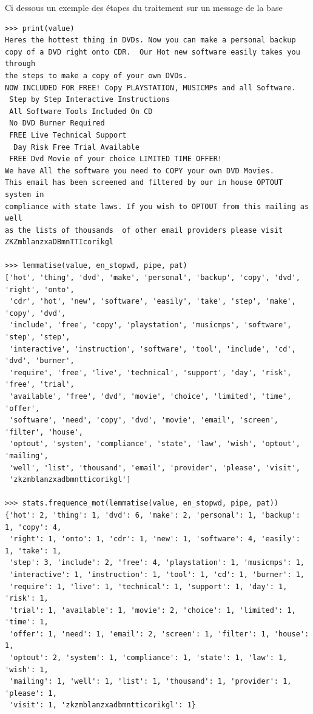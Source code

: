 \documentclass[a4paper,12pt]{article}
\begin{document}
			Ci dessous un exemple des étapes du traitement sur un message de la base
			\begin{verbatim}
>>> print(value)
Heres the hottest thing in DVDs. Now you can make a personal backup
copy of a DVD right onto CDR.  Our Hot new software easily takes you through
the steps to make a copy of your own DVDs.
NOW INCLUDED FOR FREE! Copy PLAYSTATION, MUSICMPs and all Software.
 Step by Step Interactive Instructions 
 All Software Tools Included On CD 
 No DVD Burner Required 
 FREE Live Technical Support 
  Day Risk Free Trial Available 
 FREE Dvd Movie of your choice LIMITED TIME OFFER!
We have All the software you need to COPY your own DVD Movies.
This email has been screened and filtered by our in house OPTOUT system in 
compliance with state laws. If you wish to OPTOUT from this mailing as well 
as the lists of thousands  of other email providers please visit  
ZKZmblanzxaDBmnTTIcorikgl

>>> lemmatise(value, en_stopwd, pipe, pat)
['hot', 'thing', 'dvd', 'make', 'personal', 'backup', 'copy', 'dvd', 'right', 'onto',
 'cdr', 'hot', 'new', 'software', 'easily', 'take', 'step', 'make', 'copy', 'dvd', 
 'include', 'free', 'copy', 'playstation', 'musicmps', 'software', 'step', 'step',
 'interactive', 'instruction', 'software', 'tool', 'include', 'cd', 'dvd', 'burner', 
 'require', 'free', 'live', 'technical', 'support', 'day', 'risk', 'free', 'trial',
 'available', 'free', 'dvd', 'movie', 'choice', 'limited', 'time', 'offer', 
 'software', 'need', 'copy', 'dvd', 'movie', 'email', 'screen', 'filter', 'house',
 'optout', 'system', 'compliance', 'state', 'law', 'wish', 'optout', 'mailing', 
 'well', 'list', 'thousand', 'email', 'provider', 'please', 'visit',
 'zkzmblanzxadbmntticorikgl']

>>> stats.frequence_mot(lemmatise(value, en_stopwd, pipe, pat))
{'hot': 2, 'thing': 1, 'dvd': 6, 'make': 2, 'personal': 1, 'backup': 1, 'copy': 4, 
 'right': 1, 'onto': 1, 'cdr': 1, 'new': 1, 'software': 4, 'easily': 1, 'take': 1, 
 'step': 3, 'include': 2, 'free': 4, 'playstation': 1, 'musicmps': 1, 
 'interactive': 1, 'instruction': 1, 'tool': 1, 'cd': 1, 'burner': 1, 
 'require': 1, 'live': 1, 'technical': 1, 'support': 1, 'day': 1, 'risk': 1, 
 'trial': 1, 'available': 1, 'movie': 2, 'choice': 1, 'limited': 1, 'time': 1, 
 'offer': 1, 'need': 1, 'email': 2, 'screen': 1, 'filter': 1, 'house': 1, 
 'optout': 2, 'system': 1, 'compliance': 1, 'state': 1, 'law': 1, 'wish': 1, 
 'mailing': 1, 'well': 1, 'list': 1, 'thousand': 1, 'provider': 1, 'please': 1, 
 'visit': 1, 'zkzmblanzxadbmntticorikgl': 1}
			\end{verbatim}
			
\end{document}
